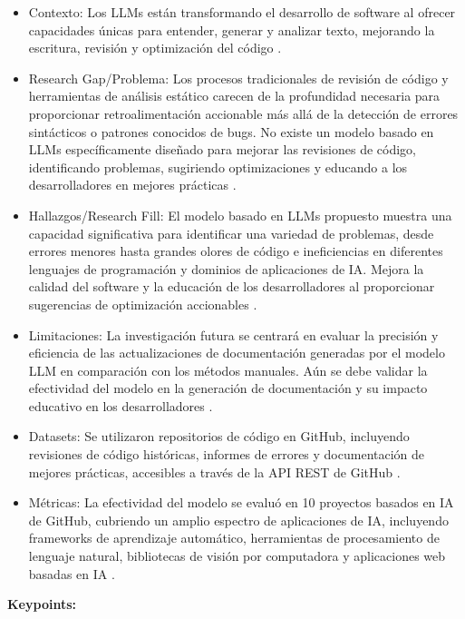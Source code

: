 \documentclass{article}
\begin{document}
\begin{itemize}
    \item Contexto: Los LLMs están transformando el desarrollo de software al ofrecer capacidades únicas para entender, generar y analizar texto, mejorando la escritura, revisión y optimización del código \cite{Rasheed_etal}.
    \item Research Gap/Problema: Los procesos tradicionales de revisión de código y herramientas de análisis estático carecen de la profundidad necesaria para proporcionar retroalimentación accionable más allá de la detección de errores sintácticos o patrones conocidos de bugs. No existe un modelo basado en LLMs específicamente diseñado para mejorar las revisiones de código, identificando problemas, sugiriendo optimizaciones y educando a los desarrolladores en mejores prácticas \cite{Rasheed_etal}.
    \item Hallazgos/Research Fill: El modelo basado en LLMs propuesto muestra una capacidad significativa para identificar una variedad de problemas, desde errores menores hasta grandes olores de código e ineficiencias en diferentes lenguajes de programación y dominios de aplicaciones de IA. Mejora la calidad del software y la educación de los desarrolladores al proporcionar sugerencias de optimización accionables \cite{Rasheed_etal}.
    \item Limitaciones: La investigación futura se centrará en evaluar la precisión y eficiencia de las actualizaciones de documentación generadas por el modelo LLM en comparación con los métodos manuales. Aún se debe validar la efectividad del modelo en la generación de documentación y su impacto educativo en los desarrolladores \cite{Rasheed_etal}.
    \item Datasets: Se utilizaron repositorios de código en GitHub, incluyendo revisiones de código históricas, informes de errores y documentación de mejores prácticas, accesibles a través de la API REST de GitHub \cite{Rasheed_etal}.
    \item Métricas: La efectividad del modelo se evaluó en 10 proyectos basados en IA de GitHub, cubriendo un amplio espectro de aplicaciones de IA, incluyendo frameworks de aprendizaje automático, herramientas de procesamiento de lenguaje natural, bibliotecas de visión por computadora y aplicaciones web basadas en IA \cite{Rasheed_etal}.
\end{itemize}

\textbf{Keypoints:}
\end{document}
